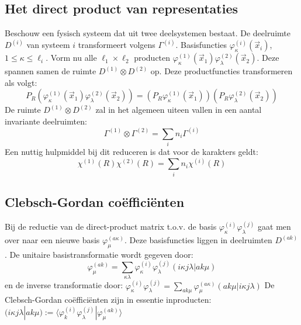 \documentclass[twoside]{report}
\begin{document}
\subsection{Het direct product van representaties}
Beschouw een fysisch systeem dat uit twee deelsystemen bestaat. De deelruimte
$D^{(i)}$ van systeem $i$ transformeert volgens $\Gamma^{(i)}$. Basisfuncties
$\varphi^{(i)}_{\kappa}(\vec{x}_i)$, $1\leq\kappa\leq\ell_i$. Vorm nu alle
$\ell_1\times\ell_2$ producten $\varphi^{(1)}_{\kappa}(\vec{x}_1)\varphi^{(2)}_{\lambda}(\vec{x}_2)$.
Deze spannen samen de ruimte $D^{(1)}\otimes D^{(2)}$ op.
\npar
Deze productfuncties transformeren als volgt:
\[
P_R(\varphi^{(1)}_{\kappa}(\vec{x}_1)\varphi^{(2)}_{\lambda}(\vec{x}_2))=(P_R\varphi^{(1)}_{\kappa}(\vec{x}_1))(P_R\varphi^{(2)}_{\lambda}(\vec{x}_2))
\]
De ruimte $D^{(1)}\otimes D^{(2)}$ zal in het algemeen uiteen vallen in een
aantal invariante deelruimten:
\[
\Gamma^{(1)}\otimes\Gamma^{(2)}=\sum_i n_i\Gamma^{(i)}
\]
Een nuttig hulpmiddel bij dit reduceren is dat voor de karakters geldt:
\[
\chi^{(1)}(R)\chi^{(2)}(R)=\sum_i n_i\chi^{(i)}(R)
\]

\subsection{Clebsch-Gordan co\"effici\"enten}
Bij de reductie van de direct-product matrix t.o.v. de basis $\varphi_{\kappa}^{(i)}\varphi_{\lambda}^{(j)}$
gaat men over naar een nieuwe basis $\varphi_{\mu}^{(a\kappa)}$. Deze basisfuncties
liggen in deelruimten $D^{(ak)}$. De unitaire basistransformatie wordt gegeven
door:
\[
\varphi_{\mu}^{(ak)}=\sum_{\kappa\lambda}\varphi^{(i)}_{\kappa}\varphi^{(j)}_{\lambda}(i\kappa j\lambda|ak\mu)
\]
en de inverse transformatie door:
$\displaystyle\varphi^{(i)}_{\kappa}\varphi^{(j)}_{\lambda}=\sum_{ak\mu}\varphi_{\mu}^{(a\kappa)}(ak\mu|i\kappa j\lambda)$
\npar
De Clebsch-Gordan co\"effici\"enten zijn in essentie inproducten:
$(i\kappa j\lambda|ak\mu):=\langle\varphi_k^{(i)}\varphi_{\lambda}^{(j)}|\varphi_{\mu}^{(ak)}\rangle$
\end{document}
